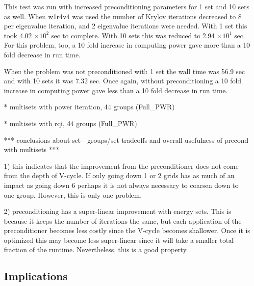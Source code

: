 This test was run with increased preconditioning parameters for 1 set and 10 sets as well. When w1r4v4 was used the number of Krylov iterations decreased to 8 per eigenvalue iteration, and 2 eigenvalue iterations were needed. With 1 set this took 4.02 $\times 10^{2}$ sec to complete. With 10 sets this was reduced to 2.94 $\times 10^{1}$ sec. For this problem, too, a 10 fold increase in computing power gave more than a 10 fold decrease in run time. 

When the problem was not preconditioned with 1 set the wall time was 56.9 sec and with 10 sets it was 7.32 sec. Once again, without preconditioning a 10 fold increase in computing power gave less than a 10 fold decrease in run time.
 
* multisets with power iteration, 44 groups (Full\_PWR)
 
* multisets with rqi, 44 groups (Full\_PWR) 

*** conclusions about set - groups/set tradeoffs and overall usefulness of precond with multisets ***

1) this indicates that the improvement from the preconditioner does not come from the depth of V-cycle. If only going down 1 or 2 grids has as much of an impact as going down 6 perhaps it is not always necessary to coarsen down to one group. However, this is only one problem. 

2) preconditioning has a super-linear improvement with energy sets. This is because it keeps the number of iterations the same, but each application of the preconditioner becomes less costly since the V-cycle becomes shallower. Once it is optimized this may become less super-linear since it will take a smaller total fraction of the runtime. Nevertheless, this is a good property. 

\subsection{Implications}




